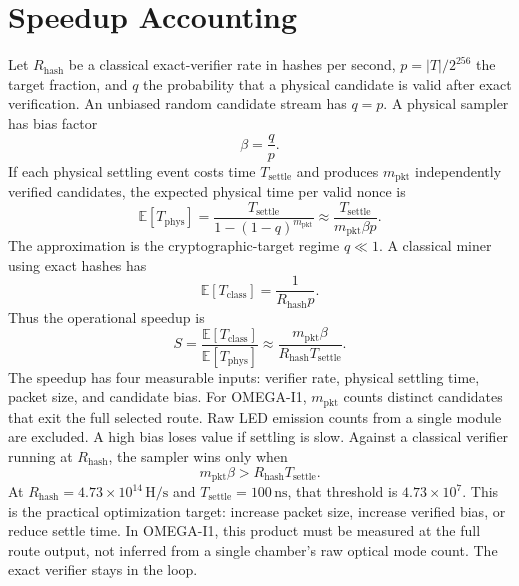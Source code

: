 \documentclass[11pt]{article}
\theoremstyle{definition}
\theoremstyle{remark}
\begin{document}
\section{Speedup Accounting}

Let \(R_{\mathrm{hash}}\) be a classical exact-verifier rate in hashes per
second, \(p=|T|/2^{256}\) the target fraction, and \(q\) the probability that a
physical candidate is valid after exact verification. An unbiased random
candidate stream has \(q=p\). A physical sampler has bias factor
\[
\beta=\frac{q}{p}.
\]
If each physical settling event costs time \(T_{\mathrm{settle}}\) and produces
\(m_{\mathrm{pkt}}\) independently verified candidates, the expected physical
time per valid nonce is
\[
\mathbb E[T_{\mathrm{phys}}]
=\frac{T_{\mathrm{settle}}}{1-(1-q)^{m_{\mathrm{pkt}}}}
\approx\frac{T_{\mathrm{settle}}}{m_{\mathrm{pkt}}\beta p}.
\]
The approximation is the cryptographic-target regime \(q\ll1\).
A classical miner using exact hashes has
\[
\mathbb E[T_{\mathrm{class}}]=\frac{1}{R_{\mathrm{hash}}p}.
\]
Thus the operational speedup is
\[
S=\frac{\mathbb E[T_{\mathrm{class}}]}{\mathbb E[T_{\mathrm{phys}}]}
\approx\frac{m_{\mathrm{pkt}}\beta}{R_{\mathrm{hash}}T_{\mathrm{settle}}}.
\]
The speedup has four measurable inputs: verifier rate, physical settling time,
packet size, and candidate bias. For OMEGA-I1, \(m_{\mathrm{pkt}}\) counts
distinct candidates that exit the full selected route. Raw LED emission counts
from a single module are excluded. A high bias loses value if settling is slow.
Against a classical verifier running at \(R_{\mathrm{hash}}\), the sampler wins
only when
\[
m_{\mathrm{pkt}}\beta>R_{\mathrm{hash}}T_{\mathrm{settle}}.
\]
At \(R_{\mathrm{hash}}=4.73\times10^{14}\,\mathrm{H/s}\) and
\(T_{\mathrm{settle}}=100\,\mathrm{ns}\), that threshold is
\(4.73\times10^7\). This is the practical optimization target: increase packet
size, increase verified bias, or reduce settle time. In OMEGA-I1, this product
must be measured at the full route output, not inferred from a single chamber's
raw optical mode count. The exact verifier stays in the loop.
\end{document}
